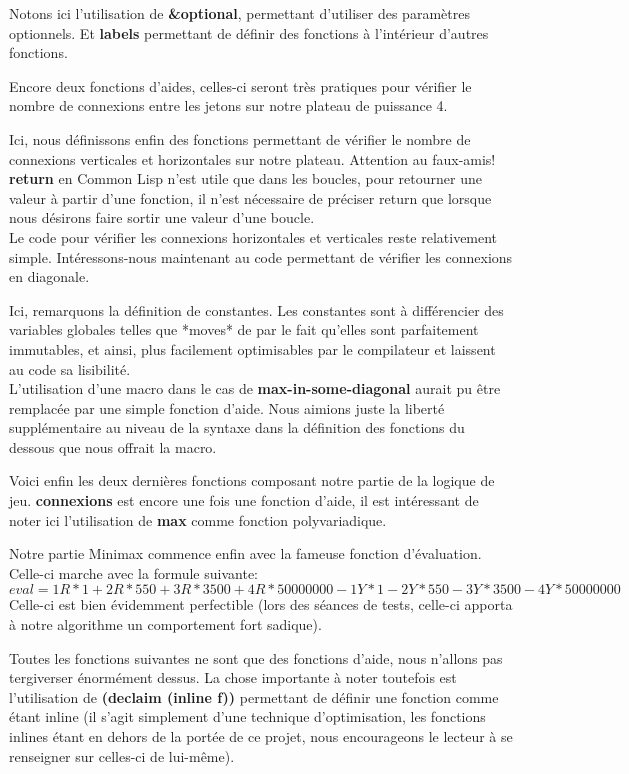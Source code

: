 \documentclass[a4paper, 12pt]{article}
\newcommand{\connect}[1]{
  
}
\numberwithin{equation}{subsection}
\begin{document}
\connect{55-67}
Notons ici l'utilisation de {\bf \&optional}, permettant d'utiliser des paramètres optionnels. Et {\bf labels} permettant de définir des fonctions à l'intérieur d'autres fonctions.

\connect{70-90}
Encore deux fonctions d'aides, celles-ci seront très pratiques pour vérifier le nombre de connexions entre les jetons sur notre plateau de puissance 4.

\connect{92-114}
Ici, nous définissons enfin des fonctions permettant de vérifier le nombre de connexions verticales et horizontales sur notre plateau. Attention au faux-amis! {\bf return} en Common Lisp n'est utile que dans les boucles, pour retourner une valeur à partir d'une fonction, il n'est nécessaire de préciser return que lorsque nous désirons faire sortir une valeur d'une boucle.\\

Le code pour vérifier les connexions horizontales et verticales reste relativement simple. Intéressons-nous maintenant au code permettant de vérifier les connexions en diagonale.

\connect{117-174}
Ici, remarquons la définition de constantes. Les constantes sont à différencier des variables globales telles que *moves* de par le fait qu'elles sont parfaitement immutables, et ainsi, plus facilement optimisables par le compilateur et laissent au code sa lisibilité. \\

L'utilisation d'une macro dans le cas de {\bf max-in-some-diagonal} aurait pu être remplacée par une simple fonction d'aide. Nous aimions juste la liberté supplémentaire au niveau de la syntaxe dans la définition des fonctions du dessous que nous offrait la macro.

\connect{176-188}
Voici enfin les deux dernières fonctions composant notre partie de la logique de jeu. {\bf connexions} est encore une fois une fonction d'aide, il est intéressant de noter ici l'utilisation de {\bf max} comme fonction polyvariadique.

\connect{190-205}
Notre partie Minimax commence enfin avec la fameuse fonction d'évaluation. Celle-ci marche avec la formule suivante:
$$eval = 1R * 1 + 2R * 550 + 3R * 3500 + 4R * 50000000 - 1Y * 1 - 2Y * 550 -3Y * 3500 - 4Y * 50000000$$
Celle-ci est bien évidemment perfectible (lors des séances de tests, celle-ci apporta à notre algorithme un comportement fort sadique).

\connect{207-257}
Toutes les fonctions suivantes ne sont que des fonctions d'aide, nous n'allons pas tergiverser énormément dessus. La chose importante à noter toutefois est l'utilisation de {\bf (declaim (inline f))} permettant de définir une fonction comme étant inline (il s'agit simplement d'une technique d'optimisation, les fonctions inlines étant en dehors de la portée de ce projet, nous encourageons le lecteur à se renseigner sur celles-ci de lui-même).
\end{document}
